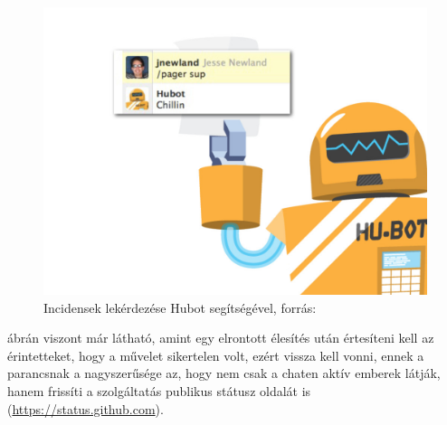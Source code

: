 \begin{figure}[ht]
  \centering
    \includegraphics[scale=1.4]{assets/pager_sup.jpg}%
    \caption[DUMMY]%
    {Incidensek lekérdezése Hubot segítségével, forrás: \cite[p.~83]{what_is_chatops_slideshow}}%
    \label{fig:pager_sup}
\end{figure}

 ábrán viszont már látható, amint egy elrontott élesítés után értesíteni kell az érintetteket, hogy a művelet sikertelen volt, ezért vissza kell vonni, ennek a parancsnak a nagyszerűsége az, hogy nem csak a chaten aktív emberek látják, hanem frissíti a szolgáltatás publikus státusz oldalát is (\url{https://status.github.com}).


